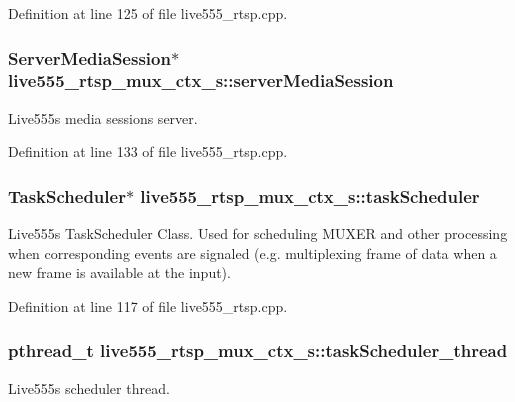Definition at line 125 of file live555\+\_\+rtsp.\+cpp.

\subsubsection[{\texorpdfstring{server\+Media\+Session}{serverMediaSession}}]{\setlength{\rightskip}{0pt plus 5cm}Server\+Media\+Session$\ast$ live555\+\_\+rtsp\+\_\+mux\+\_\+ctx\+\_\+s\+::server\+Media\+Session}\hypertarget{structlive555__rtsp__mux__ctx__s_acd9455b0d78bac504d4de35d55729e02}{}\label{structlive555__rtsp__mux__ctx__s_acd9455b0d78bac504d4de35d55729e02}
Live555\textquotesingle{}s media sessions server. 

Definition at line 133 of file live555\+\_\+rtsp.\+cpp.

\subsubsection[{\texorpdfstring{task\+Scheduler}{taskScheduler}}]{\setlength{\rightskip}{0pt plus 5cm}Task\+Scheduler$\ast$ live555\+\_\+rtsp\+\_\+mux\+\_\+ctx\+\_\+s\+::task\+Scheduler}\hypertarget{structlive555__rtsp__mux__ctx__s_a9cee4d2b64755aad6fd9d98fddcf0c30}{}\label{structlive555__rtsp__mux__ctx__s_a9cee4d2b64755aad6fd9d98fddcf0c30}
Live555\textquotesingle{}s Task\+Scheduler Class. Used for scheduling M\+U\+X\+ER and other processing when corresponding events are signaled (e.\+g. multiplexing frame of data when a new frame is available at the input). 

Definition at line 117 of file live555\+\_\+rtsp.\+cpp.

\subsubsection[{\texorpdfstring{task\+Scheduler\+\_\+thread}{taskScheduler_thread}}]{\setlength{\rightskip}{0pt plus 5cm}pthread\+\_\+t live555\+\_\+rtsp\+\_\+mux\+\_\+ctx\+\_\+s\+::task\+Scheduler\+\_\+thread}\hypertarget{structlive555__rtsp__mux__ctx__s_af825f93bf9fcae44c41ace5af235c8de}{}\label{structlive555__rtsp__mux__ctx__s_af825f93bf9fcae44c41ace5af235c8de}
Live555\textquotesingle{}s scheduler thread. 

